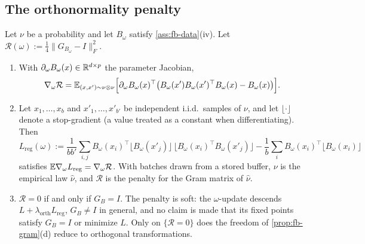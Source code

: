 \subsection{The orthonormality penalty}\label{sec:fb-orth}

\begin{proposition}[FB21 Eqs.~165--166, pp.~36--37]\label{prop:fb-orth}
Let $\nu$ be a probability and let $B_\omega$ satisfy \cref{ass:fb-data}(iv). Let $\mathcal R(\omega):=\frac14\|G_{B_\omega}-I\|_F^2$.
\begin{enumerate}[nosep,label=(\alph*)]
\item With $\partial_\omega B_\omega(x)\in\mathbb{R}^{d\times p}$ the parameter Jacobian,
  \begin{equation}\label{eq:fb-orth-grad}
  \nabla_\omega\mathcal R=\mathbb{E}_{(x,x')\sim\nu\otimes\nu}\Big[\partial_\omega B_\omega(x)^\top\big(B_\omega(x')B_\omega(x')^\top B_\omega(x)-B_\omega(x)\big)\Big].
  \end{equation}
\item Let $x_1,\dots,x_b$ and $x'_1,\dots,x'_{b'}$ be independent i.i.d.\ samples of $\nu$, and let $\lfloor\cdot\rfloor$ denote a stop-gradient (a value treated as a constant when differentiating). Then
  \begin{equation}\label{eq:fb-orth-loss}
  L_{\mathrm{reg}}(\omega):=\frac1{bb'}\sum_{i,j}B_\omega(x_i)^\top\lfloor B_\omega(x'_j)\rfloor\,\lfloor B_\omega(x_i)^\top B_\omega(x'_j)\rfloor-\frac1b\sum_iB_\omega(x_i)^\top\lfloor B_\omega(x_i)\rfloor
  \end{equation}
  satisfies $\mathbb{E}\nabla_\omega L_{\mathrm{reg}}=\nabla_\omega\mathcal R$. With batches drawn from a stored buffer, $\nu$ is the empirical law $\hat\nu$, and $\mathcal R$ is the penalty for the Gram matrix of $\hat\nu$.
\item $\mathcal R=0$ if and only if $G_B=I$. The penalty is soft: the $\omega$-update descends $L+\lambda_{\mathrm{orth}}L_{\mathrm{reg}}$, $G_B\ne I$ in general, and no claim is made that its fixed points satisfy $G_B=I$ or minimize $L$.
  Only on $\{\mathcal R=0\}$ does the freedom of \cref{prop:fb-gram}(d) reduce to orthogonal transformations.
\end{enumerate}
\end{proposition}
